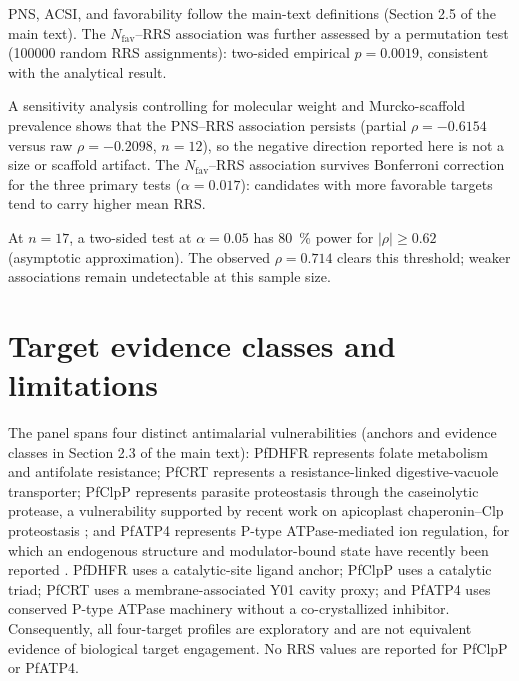 \documentclass[11pt,a4paper]{article}
\begin{document}
	PNS, ACSI, and favorability follow the main-text definitions (Section 2.5 of the main text). The $N_{\mathrm{fav}}$--RRS association was further assessed by a permutation test (\num{100000} random RRS assignments): two-sided empirical $p=\num{0.0019}$, consistent with the analytical result.
	
	A sensitivity analysis controlling for molecular weight and Murcko-scaffold prevalence shows that the PNS--RRS association persists (partial $\rho=-\num{0.6154}$ versus raw $\rho=-\num{0.2098}$, $n=\num{12}$), so the negative direction reported here is not a size or scaffold artifact. The $N_{\mathrm{fav}}$--RRS association survives Bonferroni correction for the three primary tests ($\alpha=\num{0.017}$): candidates with more favorable targets tend to carry higher mean RRS.
	
	At $n=\num{17}$, a two-sided test at $\alpha=\num{0.05}$ has \qty{80}{\percent} power for $|\rho|\geq\num{0.62}$ (asymptotic approximation). The observed $\rho=\num{0.714}$ clears this threshold; weaker associations remain undetectable at this sample size.
	
	
	
	\section{Target evidence classes and limitations}\label{sec:sm_evidence}
	The panel spans four distinct antimalarial vulnerabilities (anchors and evidence classes in Section 2.3 of the main text): PfDHFR represents folate metabolism and antifolate resistance; PfCRT represents a resistance-linked digestive-vacuole transporter; PfClpP represents parasite proteostasis through the caseinolytic protease, a vulnerability supported by recent work on apicoplast chaperonin--Clp proteostasis \cite{Tissawak2025}; and PfATP4 represents P-type ATPase-mediated ion regulation, for which an endogenous structure and modulator-bound state have recently been reported \cite{Haile2025}. PfDHFR uses a catalytic-site ligand anchor; PfClpP uses a catalytic triad; PfCRT uses a membrane-associated Y01 cavity proxy; and PfATP4 uses conserved P-type ATPase machinery without a co-crystallized inhibitor. Consequently, all four-target profiles are exploratory and are not equivalent evidence of biological target engagement. No RRS values are reported for PfClpP or PfATP4.
	
\end{document}
